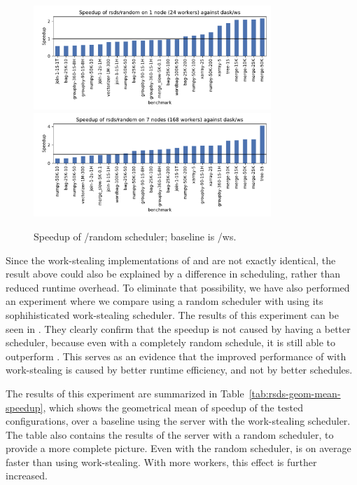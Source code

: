 \begin{figure}
	\centering
	\includegraphics[width=0.8\textwidth]{./imgs/rsds/charts/speedup-rsds-random-1}
	\includegraphics[width=0.8\textwidth]{./imgs/rsds/charts/speedup-rsds-random-7}
	\caption{Speedup of \rsds{}/random scheduler; baseline is \dask{}/ws.}
	\label{fig:rsds-dask-random-all}
\end{figure}

Since the work-stealing implementations of \rsds{} and
\dask{} are not exactly identical, the result above could also be explained by
a difference in scheduling, rather than reduced runtime overhead. To eliminate that possibility, we
have also performed an experiment where we compare \rsds{} using a random
scheduler with \dask{} using its sophihisticated work-stealing scheduler. The
results of this experiment can be seen in . They clearly confirm that
the speedup is not caused by \rsds{} having a better scheduler, because even
with a completely random schedule, it is still able to outperform \dask{}. This
serves as an evidence that the improved performance of \rsds{} with
work-stealing is caused by better runtime efficiency, and not by better schedules.

The results of this experiment are summarized in Table~\ref{tab:rsds-geom-mean-speedup}, which shows the
geometrical mean of speedup of the tested \rsds{} configurations, over a
baseline using the \dask{} server with the work-stealing scheduler. The table
also contains the results of the \dask{} server with a random scheduler, to
provide a more complete picture. Even with the random scheduler, \rsds{} is on
average faster than \dask{} using work-stealing. With more workers, this effect
is further increased.

